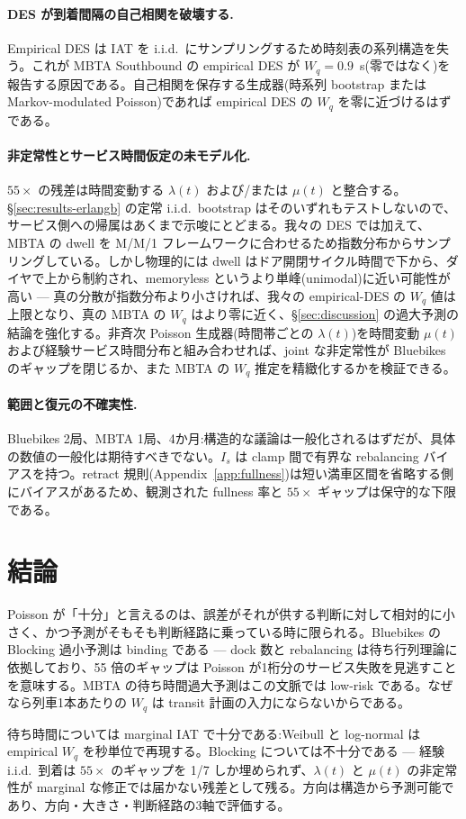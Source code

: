 \paragraph{DES が到着間隔の自己相関を破壊する.} Empirical DES は IAT を i.i.d.\ にサンプリングするため時刻表の系列構造を失う。これが MBTA Southbound の empirical DES が $W_q = 0.9$~s(零ではなく)を報告する原因である。自己相関を保存する生成器(時系列 bootstrap または Markov-modulated Poisson)であれば empirical DES の $W_q$ を零に近づけるはずである。

\paragraph{非定常性とサービス時間仮定の未モデル化.} $55\times$ の残差は時間変動する $\lambda(t)$ および/または $\mu(t)$ と整合する。\S\ref{sec:results-erlangb} の定常 i.i.d.\ bootstrap はそのいずれもテストしないので、サービス側への帰属はあくまで示唆にとどまる。我々の DES では加えて、MBTA の dwell を M/M/1 フレームワークに合わせるため指数分布からサンプリングしている。しかし物理的には dwell はドア開閉サイクル時間で下から、ダイヤで上から制約され、memoryless というより単峰(unimodal)に近い可能性が高い — 真の分散が指数分布より小さければ、我々の empirical-DES の $W_q$ 値は上限となり、真の MBTA の $W_q$ はより零に近く、\S\ref{sec:discussion} の過大予測の結論を強化する。非斉次 Poisson 生成器(時間帯ごとの $\lambda(t)$)を時間変動 $\mu(t)$ および経験サービス時間分布と組み合わせれば、joint な非定常性が Bluebikes のギャップを閉じるか、また MBTA の $W_q$ 推定を精緻化するかを検証できる。

\paragraph{範囲と復元の不確実性.} Bluebikes 2局、MBTA 1局、4か月:構造的な議論は一般化されるはずだが、具体の数値の一般化は期待すべきでない。$I_s$ は clamp 間で有界な rebalancing バイアスを持つ。retract 規則(Appendix~\ref{app:fullness})は短い満車区間を省略する側にバイアスがあるため、観測された fullness 率と $55\times$ ギャップは保守的な下限である。

\section{結論}\label{sec:conclusion}

Poisson が「十分」と言えるのは、誤差がそれが供する判断に対して相対的に小さく、かつ予測がそもそも判断経路に乗っている時に限られる。Bluebikes の Blocking 過小予測は binding である — dock 数と rebalancing は待ち行列理論に依拠しており、55 倍のギャップは Poisson が1桁分のサービス失敗を見逃すことを意味する。MBTA の待ち時間過大予測はこの文脈では low-risk である。なぜなら列車1本あたりの $W_q$ は transit 計画の入力にならないからである。

待ち時間については marginal IAT で十分である:Weibull と log-normal は empirical $W_q$ を秒単位で再現する。Blocking については不十分である — 経験 i.i.d.\ 到着は $55\times$ のギャップを 1/7 しか埋められず、$\lambda(t)$ と $\mu(t)$ の非定常性が marginal な修正では届かない残差として残る。方向は構造から予測可能であり、方向・大きさ・判断経路の3軸で評価する。

